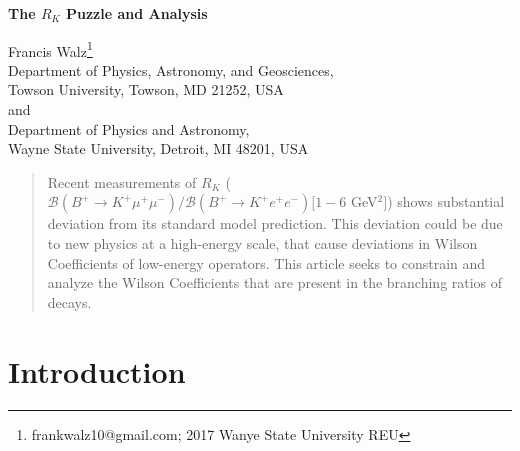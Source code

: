 \documentclass[12pt]{article}
\begin{document}
    \begin{center}
        \vspace*{1cm}
        
        \Huge
        \textbf{The $R_K$ Puzzle and Analysis}
        
        \vskip 20pt
        
        \large{Francis Walz}\footnote{frankwalz10@gmail.com; 2017 Wanye State University REU}\\ Department of Physics, Astronomy, and Geosciences, \\ Towson University, Towson, MD 21252, USA \\
          and \\
        Department of Physics and Astronomy, \\ Wayne State University, Detroit, MI 48201, USA
        
        \begin{abstract}
        Recent measurements of $R_K$ ($\mathcal{B}(B^+\rightarrow K^+\mu^+\mu^-)/ \mathcal{B}(B^+\rightarrow K^+e^+e^-) [1-6$  GeV$^2]$) shows substantial deviation from its standard model prediction. This deviation could be due to new physics at a high-energy scale, that cause deviations in Wilson Coefficients of low-energy operators. This article seeks to constrain and analyze the Wilson Coefficients that are present in the branching ratios of decays.  
        \end{abstract}
        \vfill
    \end{center}
    
\tableofcontents

\section{Introduction}
\end{document}
